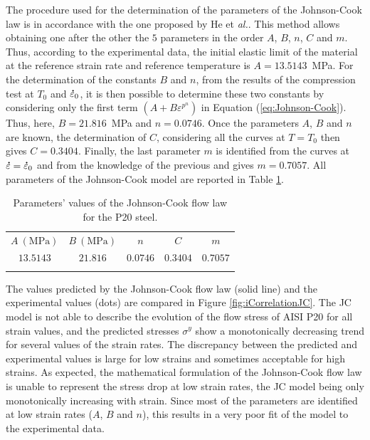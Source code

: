 \documentclass[twoside,english,1p,final,sort&compress]{elsarticle}
\makeatletter
\theoremstyle{plain}
\newcommand{\mdot}[1]{\accentset{\mbox{\bfseries .}}{#1}}
\newcommand*{\eal}{et \emph{al.}\@\xspace}
\makeatother
\begin{document}
The procedure used for the determination of the parameters of the Johnson-Cook law is in accordance with the one proposed by He \eal \cite{He-2013}.
This method allows obtaining one after the other the $5$ parameters in the order $A$, $B$, $n$, $C$ and $m$.
Thus, according to the experimental data, the initial elastic limit of the material at the reference strain rate and reference temperature is $A=13.5143$~MPa.
For the determination of the constants $B$ and $n$, from the results of the compression test at $T_0$ and $\mdot\varepsilon_0$, it is then possible to determine these two constants by considering only the first term $\left(A+B\varepsilon^{p^{n}}\right)$ in Equation (\ref{eq:Johnson-Cook}).
Thus, here, $B=21.816$~MPa and $n=0.0746$.
Once the parameters $A$, $B$ and $n$ are known, the determination of $C$, considering all the curves at $T=T_0$ then gives $C=0.3404$.
Finally, the last parameter $m$ is identified from the curves at $\mdot\varepsilon=\mdot\varepsilon_0$ and from the knowledge of the previous and gives $m=0.7057$.
All parameters of the Johnson-Cook model are reported in Table \ref{tab:JCparams}.

\begin{table}[h!]
\centering
\caption{Parameters' values of the Johnson-Cook flow law for the P20 steel.}
\begin{tabular}{ccccc}
\hline
$A~(\text{MPa})$ & $B~(\text{MPa})$ & $n$ & $C$ & $m$\\
$13.5143$&$21.816$&$0.0746$&$0.3404$&$0.7057$\\ \hline
\label{tab:JCparams}
\end{tabular}
\end{table}

The values predicted by the Johnson-Cook flow law (solid line) and the experimental values (dots) are compared in Figure \ref{fig:iCorrelationJC}.
The JC model is not able to describe the evolution of the flow stress of AISI P20 for all strain values, and the predicted stresses $\sigma^y$ show a monotonically decreasing trend for several values of the strain rates.
The discrepancy between the predicted and experimental values is large for low strains and sometimes acceptable for high strains.
As expected, the mathematical formulation of the Johnson-Cook flow law is unable to represent the stress drop at low strain rates, the JC model being only monotonically increasing with strain.
Since most of the parameters are identified at low strain rates ($A$, $B$ and $n$), this results in a very poor fit of the model to the experimental data.
\end{document}
